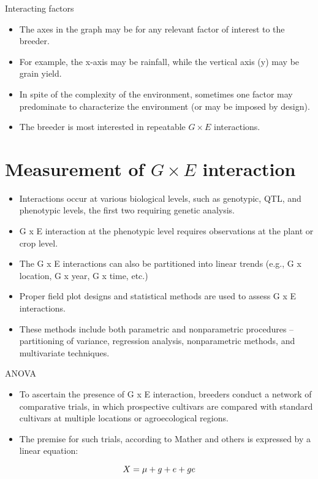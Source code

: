 \documentclass[11pt,dvipsnames,ignorenonframetext,aspectratio=169]{beamer}
\providecommand{\tightlist}{%
  \setlength{\itemsep}{0pt}\setlength{\parskip}{0pt}}
\begin{document}
\begin{frame}{Interacting factors}
\protect\hypertarget{interacting-factors}{}
\begin{itemize}
\tightlist
\item
  The axes in the graph may be for any relevant factor of interest to
  the breeder.
\item
  For example, the x-axis may be rainfall, while the vertical axis (y)
  may be grain yield.
\item
  In spite of the complexity of the environment, sometimes one factor
  may predominate to characterize the environment (or may be imposed by
  design).
\item
  The breeder is most interested in repeatable \(G \times E\)
  interactions.
\end{itemize}
\end{frame}

\hypertarget{measurement-of-g-times-e-interaction}{%
\section{\texorpdfstring{Measurement of \(G \times E\)
interaction}{Measurement of G \textbackslash times E interaction}}\label{measurement-of-g-times-e-interaction}}

\begin{frame}{}
\protect\hypertarget{section-4}{}
\begin{itemize}
\tightlist
\item
  Interactions occur at various biological levels, such as genotypic,
  QTL, and phenotypic levels, the first two requiring genetic analysis.
\item
  G x E interaction at the phenotypic level requires observations at the
  plant or crop level.
\item
  The G x E interactions can also be partitioned into linear trends
  (e.g., G x location, G x year, G x time, etc.)
\item
  Proper field plot designs and statistical methods are used to assess G
  x E interactions.
\item
  These methods include both parametric and nonparametric procedures --
  partitioning of variance, regression analysis, nonparametric methods,
  and multivariate techniques.
\end{itemize}
\end{frame}

\begin{frame}{ANOVA}
\protect\hypertarget{anova}{}
\begin{itemize}
\tightlist
\item
  To ascertain the presence of G x E interaction, breeders conduct a
  network of comparative trials, in which prospective cultivars are
  compared with standard cultivars at multiple locations or
  agroecological regions.
\item
  The premise for such trials, according to Mather and others is
  expressed by a linear equation:
\end{itemize}

\[
\Large
X = \mu + g + e + ge
\]
\end{frame}
\end{document}
